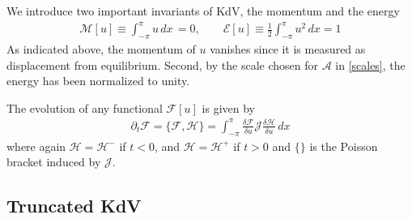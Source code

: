 \documentclass[11pt]{article}
\newcommand{\dx}{\, dx}
\newcommand{\En}{\mathcal{E}}
\newcommand{\Mo}{\mathcal{M}}
\newcommand{\ampscale}{\mathcal{A}}
\newcommand{\sympJ}{\mathcal{J}}
\newcommand{\vard}[2]{\frac{\delta #1}{\delta #2}}
\newcommand{\Ham}{\mathcal{H}}
\newcommand{\Hup}{\Ham^{-}}
\newcommand{\Hdn}{\Ham^{+}}
\begin{document}

We introduce two important invariants of KdV, the momentum and the energy
\begin{align}
\label{MomEn}
\Mo[u] \equiv \int_{-\pi}^{\pi} u \dx \, = 0 , \qquad
\En[u] \equiv \frac{1}{2} \int_{-\pi}^{\pi} u^2 \dx = 1
\end{align}
As indicated above, the momentum of $u$ vanishes since it is measured as displacement from equilibrium. Second, by the scale chosen for $\ampscale$ in \eqref{scales}, the energy has been normalized to unity.

The evolution of any functional $\mathcal{F}[u]$ is given by 
\begin{align}
\partial_t \mathcal{F} = \{ \mathcal{F}, \Ham \} = \int_{-\pi}^{\pi} \vard{\mathcal{F}}{u} \sympJ \vard{\Ham}{u} \dx
\end{align}
where again $\Ham = \Hup$ if $t<0$, and $\Ham = \Hdn$ if $t>0$ and $\{\}$ is the Poisson bracket induced by $\sympJ$.



\subsection{Truncated KdV}
\label{tKdVSec}
\end{document}
